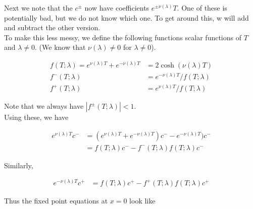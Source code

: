 \documentclass[12pt]{article}
\begin{document}
\begin{enumerate}
Next we note that the $c^\pm$ now have coefficients $e^{\pm \nu(\lambda) }T$. One of these is potentially bad, but we do not know which one. To get around this, w will add and subtract the other version. \\

To make this less messy, we define the following functions scalar functions of $T$ and $\lambda \neq 0$. (We know that $\nu(\lambda) \neq 0$ for $\lambda \neq 0$).

\begin{align*}
f(T; \lambda) = e^{\nu(\lambda)T} + e^{-\nu(\lambda)T} &= 2 \cosh (\nu(\lambda) T) \\
f^-(T; \lambda) &= e^{-\nu(\lambda)T} / f(T; \lambda) \\
f^+(T; \lambda) &= e^{\nu(\lambda)T} / f(T; \lambda)
\end{align*}

Note that we always have $|f^\pm(T; \lambda)| < 1$.\\

Using these, we have

\begin{align*}
e^{\nu(\lambda)T} c^- &= (e^{\nu(\lambda)T} + e^{-\nu(\lambda)T})c^- - e^{-\nu(\lambda)T})c^- \\
&= f(T; \lambda) c^- - f^-(T; \lambda)f(T; \lambda) c^-
\end{align*}

Similarly,

\begin{align*}
e^{-\nu(\lambda)T} c^+ &= f(T; \lambda) c^+ - f^+(T; \lambda)f(T; \lambda) c^+
\end{align*}

Thus the fixed point equations at $x = 0$ look like


\end{enumerate}
\end{document}
